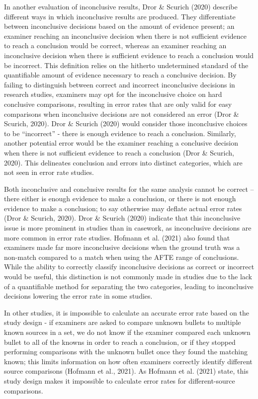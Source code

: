 \documentclass[print]{nuthesis}
\begin{document}
In another evaluation of inconclusive results, Dror \& Scurich (2020) describe different ways in which inconclusive results are produced.
They differentiate between inconclusive decisions based on the amount of evidence present; an examiner reaching an inconclusive decision when there is not sufficient evidence to reach a conclusion would be correct, whereas an examiner reaching an inconclusive decision when there is sufficient evidence to reach a conclusion would be incorrect.
This definition relies on the hitherto undetermined standard of the quantifiable amount of evidence necessary to reach a conclusive decision.
By failing to distinguish between correct and incorrect inconclusive decisions in research studies, examiners may opt for the inconclusive choice on hard conclusive comparisons, resulting in error rates that are only valid for easy comparisons when inconclusive decisions are not considered an error (Dror \& Scurich, 2020).
Dror \& Scurich (2020) would consider those inconclusive choices to be ``incorrect'' - there is enough evidence to reach a conclusion.
Similarly, another potential error would be the examiner reaching a conclusive decision when there is not sufficient evidence to reach a conclusion (Dror \& Scurich, 2020).
This delineates conclusion and errors into distinct categories, which are not seen in error rate studies.

Both inconclusive and conclusive results for the same analysis cannot be correct -- there either is enough evidence to make a conclusion, or there is not enough evidence to make a conclusion; to say otherwise may deflate actual error rates (Dror \& Scurich, 2020).
Dror \& Scurich (2020) indicate that this inconclusive issue is more prominent in studies than in casework, as inconclusive decisions are more common in error rate studies.
Hofmann et al. (2021) also found that examiners made far more inconclusive decisions when the ground truth was a non-match compared to a match when using the AFTE range of conclusions.
While the ability to correctly classify inconclusive decisions as correct or incorrect would be useful, this distinction is not commonly made in studies due to the lack of a quantifiable method for separating the two categories, leading to inconclusive decisions lowering the error rate in some studies.

In other studies, it is impossible to calculate an accurate error rate based on the study design - if examiners are asked to compare unknown bullets to multiple known sources in a set, we do not know if the examiner compared each unknown bullet to all of the knowns in order to reach a conclusion, or if they stopped performing comparisons with the unknown bullet once they found the matching known; this limits information on how often examiners correctly identify different source comparisons (Hofmann et al., 2021).
As Hofmann et al. (2021) state, this study design makes it impossible to calculate error rates for different-source comparisons.
\end{document}
